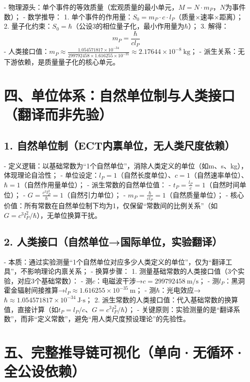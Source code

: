 \documentclass{article}
\begin{document}
- 物理源头：单个事件的等效质量（宏观质量的最小单元，$M=N \cdot m_P$，$N$为事件数）；
- 数学推导：
  1. 单个事件的作用量：$S_0 = m_P \cdot c \cdot l_P$（质量×速率×距离）；
  2. 量子化约束：$S_0 = \hbar$（公设3的相位量子化，最小作用量为$\hbar$）；
  3. 解得：
\[
m_P = \frac{\hbar}{c l_P}
\]
- 人类接口值：$m_P \approx \frac{1.054571817 \times 10^{-34}}{299792458 \times 1.616255 \times 10^{-35}} \approx 2.17644 \times 10^{-8}\ \text{kg}$；
- 派生关系：无下游依赖，是质量量子化的核心单元。

\section*{四、单位体系：自然单位制与人类接口（翻译而非先验）}

\subsection*{1. 自然单位制（ECT内禀单位，无人类尺度依赖）}

- 定义逻辑：以基础常数为“1个自然单位”，消除人类定义的单位（如m、s、kg），体现理论自洽性；
- 单位设定：$l_P=1$（自然长度单位）、$c=1$（自然速率单位）、$\hbar=1$（自然作用量单位）；
- 派生常数的自然单位值：
  - $t_P = \frac{l_P}{c} = 1$（自然时间单位）；
  - $G = \frac{c^3 l_P^2}{\hbar} = 1$（自然引力单位）；
  - $m_P = \frac{\hbar}{c l_P} = 1$（自然质量单位）；
- 核心价值：所有常数在自然单位制下均为1，仅保留“常数间的比例关系”（如$G = c^3 l_P^2/\hbar$），无单位换算干扰。

\subsection*{2. 人类接口（自然单位→国际单位，实验翻译）}

- 本质：通过实验测量“1个自然单位对应多少人类定义的单位”，仅为“翻译工具”，不影响理论内禀关系；
- 换算步骤：
  1. 测量基础常数的人类接口值（3个实验，对应3个基础常数）：
     - 测$c$：电磁波干涉→$c=299792458\ \text{m/s}$；
     - 测$l_P$：黑洞霍金辐射间接推算→$l_P\approx1.616255\times10^{-35}\ \text{m}$；
     - 测$\hbar$：光电效应→$\hbar\approx1.054571817\times10^{-34}\ \text{J·s}$；
  2. 派生常数的人类接口值：代入基础常数的换算值，直接计算（如$t_P=l_P/c$、$G=c^3 l_P^2/\hbar$）；
- 关键原则：实验测量的是“翻译系数”，而非“定义常数”，避免“用人类尺度预设理论”的先验性。

\section*{五、完整推导链可视化（单向·无循环·全公设依赖）}
\end{document}
